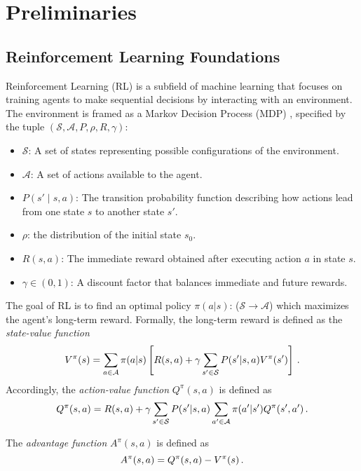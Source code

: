 \section{Preliminaries}
\label{sec:preliminaries}
\subsection{Reinforcement Learning Foundations}
Reinforcement Learning (RL) is a subfield of machine learning that focuses on training agents to make sequential decisions by interacting with an environment. The environment is framed as a Markov Decision Process (MDP) \citep{sutton2018reinforcement}, specified by the tuple \((\mathcal{S}, \mathcal{A}, P, \rho, R, \gamma)\):
\begin{itemize}
    \item \(\mathcal{S}\): A set of states representing possible configurations of the environment.
    \item \(\mathcal{A}\): A set of actions available to the agent.
    \item \(P(s' \mid s,a)\): The transition probability function describing how actions lead from one state \(s\) to another state \(s'\).
    \item $\rho$: the distribution of the initial state $s_0$.
    \item \(R(s,a)\): The immediate reward obtained after executing action \(a\) in state \(s\).
    \item \(\gamma \in (0,1)\): A discount factor that balances immediate and future rewards.
\end{itemize}


The goal of RL is to find an optimal policy $\pi(a|s)$: ($\mathcal{S} \rightarrow \mathcal{A}$) which maximizes the agent's long-term reward. Formally, the long-term reward is defined as the \emph{state-value function}
% 
\begin{equation}
\small
V^{\pi}(s) =\sum_{a\in\mathcal{A}} \pi(a|s)\left[R(s,a)+\gamma \sum_{s'\in\mathcal{S}} P(s'|s,a)V^{\pi}(s')\right] \, .
\label{eq:state}
\end{equation}
% 
Accordingly, the \emph{action-value function} $Q^{\pi}(s, a)$ is defined as
% 
\begin{equation}
    \small
    Q^{{\pi}}(s, a) = R(s,a)+\gamma \sum_{s'\in\mathcal{S}} P(s'|s,a) \sum_{a'\in\mathcal{A}}\pi(a'|s')Q^{\pi}(s', a') \, .
    \label{eq:action}
\end{equation}

The \emph{advantage function} $A^{\pi} (s,a)$ is defined as
\begin{equation}
    \small
    A^{{\pi}}(s, a) = Q^{\pi}(s,a)-V^{\pi}(s) \, .
    \label{eq:advantage}
\end{equation}


